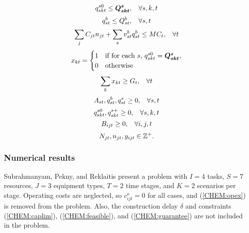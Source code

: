 \begin{equation*}
q^{s0}_{skt} \leq \mathbf{\boldsymbol{Q^s_{skt}}}, \hspace{3mm} \forall s,k,t
\end{equation*}
\begin{equation*}
q^b_{st} \leq Q^b_{st}, \hspace{3mm} \forall s,t
\end{equation*}
\begin{equation}
\label{CHEM:caplim}
\sum_{j}C_{jt}n_{jt} + \sum_s v^b_{st} q^b_{st} \leq MC_t, \hspace{3mm} \forall t
\end{equation}
\begin{equation}
\label{CHEM:feasible}
x_{kt}=
	\begin{cases}
		1& \text{if for each $s$, $q^{s0}_{skt} = \mathbf{\boldsymbol{Q^s_{skt}}}$},\\
		0& \text{otherwise}
	\end{cases}
\end{equation}
\begin{equation}
\label{CHEM:guarantee}
\sum_k x_{kt} \geq G_t, \hspace{3mm} \forall t
\end{equation}
\begin{equation*}
A_{st}, q^b_{st}, q^s_{st} \geq 0, \hspace{3mm} \forall s,t
\end{equation*}
\begin{equation*}
q^{s0}_{skt}, q^{s+}_{skt} \geq 0, \hspace{3mm} \forall s,k,t
\end{equation*}
\begin{equation*}
 B_{ijt} \geq 0, \hspace{3mm} \forall i,j,t
\end{equation*}
\begin{equation*}
N_{jt}, n_{jt}, y_{ijt} \in {\mathbb Z}^+.
\end{equation*}

\subsubsection{Numerical results}
Subrahmanyam, Pekny, and Reklaitis \cite{subrahmanyam94} present a problem with $I=4$ tasks, $S=7$ resources, $J=3$ equipment types, $T=2$ time stages, and $K=2$ scenarios per stage.  Operating costs are neglected, so $c_{ijt}^o = 0$ for all cases, and (\ref{CHEM:opex}) is removed from the problem.  Also, the construction delay $\delta$ and constraints (\ref{CHEM:caplim}), (\ref{CHEM:feasible}), and (\ref{CHEM:guarantee}) are not included in the problem.

